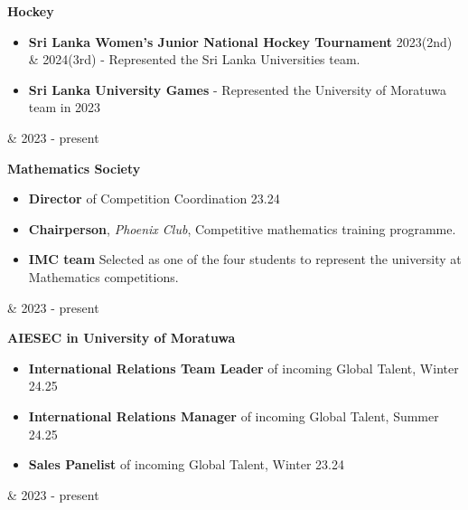 \documentclass[10pt, a4paper]{article}
\newenvironment{highlights}{
        \begin{itemize}[
                topsep=0pt,
                parsep=0.10 cm,
                partopsep=0pt,
                itemsep=0pt,
                after=\vspace{-1\baselineskip},
                leftmargin=0.4 cm + 3pt
            ]
    }{
        \end{itemize}
    } %
\let\originalTabularx\tabularx
\let\originalEndTabularx\endtabularx
\renewenvironment{tabularx}{\bgroup\centering\originalTabularx}{\originalEndTabularx\par\egroup}
\begin{document}
	
		\begin{tabularx}{\textwidth-0.4 cm-0.13cm}{K{0.2 cm} R{4.1 cm}}
            \textbf{Hockey}
            \vspace{0.10 cm}
             \begin{highlights}
	        \item \textbf{Sri Lanka Women's Junior National Hockey Tournament} 2023(2nd) \& 2024(3rd) - Represented the Sri Lanka Universities team.
	        \item \textbf{Sri Lanka University Games} - Represented the University of Moratuwa team in 2023
	        \end{highlights}
            &
            2023 - present
           \end{tabularx}
           
           
	\vspace{0.2 cm}	
		\begin{tabularx}{\textwidth-0.4 cm-0.13cm}{K{0.2 cm} R{4.1 cm}}
            \textbf{Mathematics Society}
            \vspace{0.10 cm}
            \begin{highlights}
                \item \textbf{Director} of Competition Coordination 23.24
                \item \textbf{Chairperson}, \textit{Phoenix Club}, Competitive mathematics training
 programme. 
 			\item \textbf{IMC team} Selected as one of the four students to represent the university at Mathematics competitions.
 		\end{highlights}
            &
            2023 - present
           \end{tabularx}
			
		\vspace{0.2 cm}
		\begin{tabularx}{\textwidth-0.4 cm-0.13cm}{K{0.2 cm} R{4.1 cm}}
            \textbf{AIESEC in University of Moratuwa}
            \vspace{0.10 cm}
            \begin{highlights}
            \item \textbf{International Relations Team Leader} of incoming Global Talent, Winter 24.25
	        \item \textbf{International Relations Manager} of incoming Global Talent, Summer 24.25
	        \item \textbf{Sales Panelist} of incoming Global Talent, Winter 23.24
	        \end{highlights}
            &
            2023 - present
           \end{tabularx}
           
\end{document}
